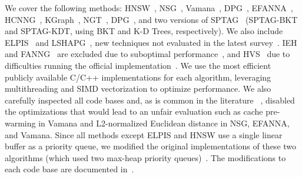 


 We cover the following methods: HNSW~\cite{hnsw}, NSG~\cite{nsg}, Vamana~\cite{vamana}, DPG~\cite{dpg}, EFANNA~\cite{efanna}, HCNNG~\cite{hcnng}, KGraph~\cite{kgraph}, NGT~\cite{ngt_library}, DPG~\cite{dpg}, and two versions of SPTAG~\cite{SPTAG4} (SPTAG-BKT and SPTAG-KDT, using BKT and K-D Trees, respectively). We also include ELPIS~\cite{elpis} and LSHAPG~\cite{lshapg}, new techniques not evaluated in the latest survey~\cite{graph-survey-vldb}. IEH~\cite{ieh} and FANNG~\cite{fanng} are excluded due to suboptimal performance~\cite{graph-survey-vldb, nsg}, and HVS~\cite{hvs} due to difficulties running the official implementation~\cite{hvsgithub}. We use the most efficient publicly available C/C++ implementations for each algorithm, leveraging multithreading and SIMD vectorization to optimize performance.  We also carefully inspected all code bases and, as is common in the literature ~\cite{graph-survey-vldb, diskanncode, nsgcode,ssgcode,ngtcode,sptagcode}, disabled the optimizations that would lead to an unfair evaluation such as cache pre-warming in Vamana and L2-normalized Euclidean distance in NSG, EFANNA, and Vamana. Since all methods except ELPIS and HNSW use a single linear buffer as a priority queue, we modified the original implementations of these two algorithms (which used two max-heap priority queues)~\cite{url/Elpis,url/hnsw}. The modifications to each code base are documented in~\cite{url/GASS}.



